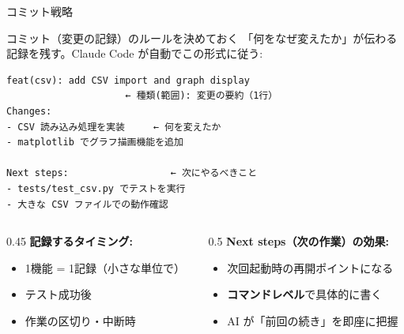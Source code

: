 \documentclass[aspectratio=169, 14pt]{beamer}
\begin{document}
\begin{frame}[fragile]{コミット戦略}
  \begin{block}{コミット（変更の記録）のルールを決めておく}
    {\scriptsize 「何をなぜ変えたか」が伝わる記録を残す。Claude Code が自動でこの形式に従う:}
    \begin{lstlisting}[language={}, numbers=none]
feat(csv): add CSV import and graph display
                     ← 種類(範囲): 変更の要約（1行）
Changes:
- CSV 読み込み処理を実装     ← 何を変えたか
- matplotlib でグラフ描画機能を追加

Next steps:                  ← 次にやるべきこと
- tests/test_csv.py でテストを実行
- 大きな CSV ファイルでの動作確認
    \end{lstlisting}
  \end{block}

  \begin{columns}[T]
    \begin{column}{0.45\textwidth}
      {\small \textbf{記録するタイミング:}}
      \begin{itemize}\scriptsize
        \item 1機能 = 1記録（小さな単位で）
        \item テスト成功後
        \item 作業の区切り・中断時
      \end{itemize}
    \end{column}
    \begin{column}{0.5\textwidth}
      {\small \textbf{Next steps（次の作業）の効果:}}
      \begin{itemize}\scriptsize
        \item 次回起動時の再開ポイントになる
        \item \textbf{コマンドレベル}で具体的に書く
        \item AI が「前回の続き」を即座に把握
      \end{itemize}
    \end{column}
  \end{columns}
\end{frame}
\end{document}
